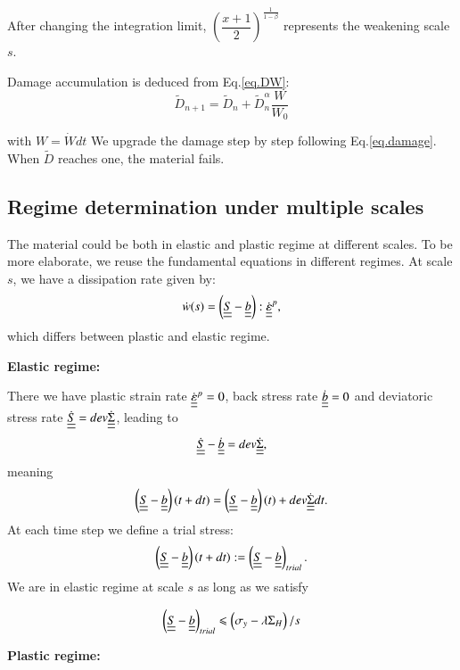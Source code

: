 \documentclass[3p,times,number,review]{elsarticle}
\begin{document}
After changing the integration limit, $\left( \dfrac{x+1}{2}\right) ^{\frac{1}{1-\beta}}$ represents the weakening scale $s$. 

Damage accumulation is deduced from Eq.\eqref{eq.DW}:
\begin{equation}
\tilde{D}_{n+1}=\tilde{D}_n+\tilde{D}_n^\alpha\dfrac{W}{W_0}
\label{eq.damage}
\end{equation}

with $W=\dot{W}dt$
We upgrade the damage step by step following Eq.\eqref{eq.damage}. When $\tilde{D}$ reaches one, the material fails. 

\subsection{Regime determination under multiple scales}
The material could be both in elastic and plastic regime at different scales. To be more elaborate, we reuse the fundamental equations in different regimes. At scale $s$, we have a dissipation rate given by:
$$\dot{w}(s)=\left( \uline{\uline{S}}-\uline{\uline{b}}\right):\dot{\uline{\uline{\varepsilon}}}^p, $$
which differs between plastic and elastic regime.

\vspace{6pt}
\noindent
\textbf{Elastic regime:}

\vspace{6pt}
\noindent
There we have
plastic strain rate
$\dot{\uline{\uline{\varepsilon}}}^p=0$, back stress rate $\dot{\uline{\uline{b}}}=0$ and deviatoric stress rate $\dot{\uline{\uline{S}}}=dev\dot{\uline{\uline{\Sigma}}}$, leading to
$$\dot{\uline{\uline{S}}}-\dot{\uline{\uline{b}}}=dev\dot{\uline{\uline{\Sigma}}},$$ 
meaning
$$\left( \uline{\uline{S}}-\uline{\uline{b}}\right) (t+dt)=\left( \uline{\uline{S}}-\uline{\uline{b}}\right) (t)+dev\dot{\uline{\uline{\Sigma}}}dt.$$
At each time step we define a trial stress:
\begin{equation}
\left( \uline{\uline{S}}-\uline{\uline{b}}\right)(t+dt):=\left( \uline{\uline{S}}-\uline{\uline{b}}\right)_{trial}.
\label{trial}
\end{equation}
We are in elastic regime at scale $s$ as long as we satisfy

$$\left( \uline{\uline{S}}-\uline{\uline{b}}\right)_{trial}\leqslant\left( \sigma_y-\lambda \Sigma_H\right)/s  $$

\vspace{6pt}
\noindent
\textbf{Plastic regime:}
\end{document}
